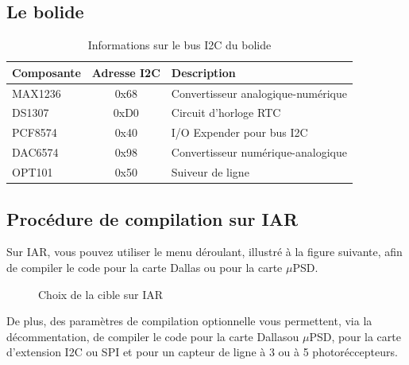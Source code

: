 \documentclass[10pt,a4paper,final]{article}
\begin{document}
\begin{spacing}{1.5}
\subsection{Le bolide}
\begin{table}[!ht]
\centering
\begin{tabular}{|l|c|l|}
\hline 
\textbf{Composante} & \textbf{Adresse I{\small 2}C} & \textbf{Description} \\ 
\hline 
MAX1236 & 0x68 & Convertisseur analogique-numérique \\ 
\hline 
DS1307  & 0xD0 & Circuit d'horloge RTC \\ 
\hline 
PCF8574 & 0x40 & I/O Expender pour bus I{\small 2}C \\ 
\hline 
DAC6574 & 0x98  & Convertisseur numérique-analogique  \\ 
\hline 
OPT101  &  0x50 & Suiveur de ligne  \\ 
\hline 
\end{tabular} 
\caption{Informations sur le bus I{\small 2}C du bolide}
\label{tab:testtab1}
\end{table}

\pagebreak
\subsection{Procédure de compilation sur IAR}
Sur IAR, vous pouvez utiliser le menu déroulant, illustré à la figure suivante, afin de compiler le code pour la carte Dallas ou pour la carte $\mu$PSD. 

\begin{figure}[hbtp]
\caption{Choix de la cible sur IAR}
\centering
{}
\end{figure}

De plus, des paramètres de compilation optionnelle vous permettent, via la décommentation, de compiler le code pour la carte Dallasou $\mu$PSD, pour la carte d'extension I2C ou SPI et pour un capteur de ligne à 3 ou à 5 photoréccepteurs.\\
\end{spacing}
\end{document}
